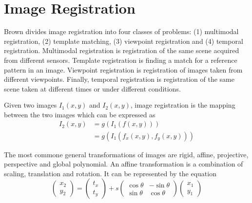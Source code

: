 \documentclass[11pt]{book}
\theoremstyle{example}
\begin{document}
\section{Image Registration}

Brown divides image registration into four classes of problems: (1) multimodal registration, (2) template matching, (3) viewpoint registration and (4) temporal registration. Multimodal registration is registration of the same scene acquired from different sensors. Template registration is finding a match for a reference pattern in an image. Viewpoint registration is registration of images taken from different viewpoints. Finally, temporal registration is registration of the same scene taken at different times or under different conditions.

Given two images $I_1(x,y)$ and $I_2(x,y)$, image registration is the mapping between the two images which can be expressed as
\begin{align}
	I_2(x,y)&=g(I_1(f(x,y)))\\
	&=g(I_1(f_x(x,y),f_y(x,y)))
\end{align}

The most commone general transformations of images are rigid, affine, projective, perspective and global polynomial. An affine transformation is a combination of scaling, translation and rotation. It can be represented by the equation
\begin{equation}
	\begin{pmatrix}
		x_2\\
		y_2
	\end{pmatrix}=
	\begin{pmatrix}
		t_x\\
		t_y
	\end{pmatrix}+
	s\begin{pmatrix}
		\cos{\theta}&-\sin{\theta}\\
		\sin{\theta}&\cos{\theta}
	\end{pmatrix}
	\begin{pmatrix}
		x_1\\
		y_1
	\end{pmatrix}
\end{equation}

\backmatter
\end{document}
